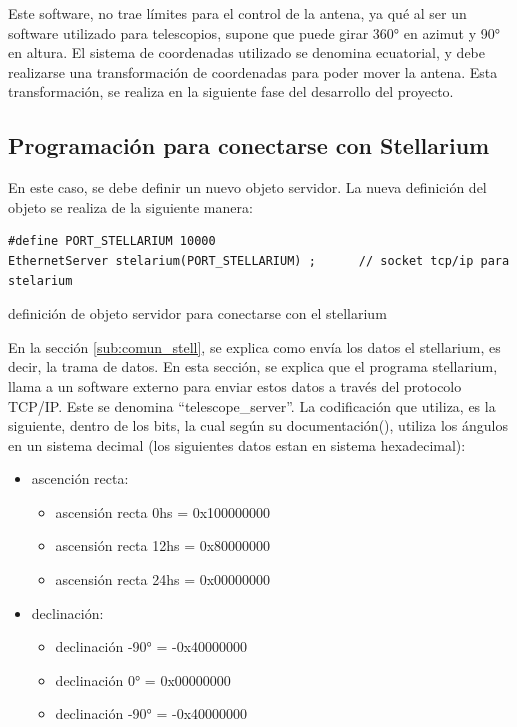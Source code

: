 Este software, no trae límites para el control de la antena, ya qué al ser un software utilizado para telescopios, supone que puede girar 360° en azimut y 90° en altura. El sistema de coordenadas utilizado se denomina ecuatorial, y debe realizarse una transformación de coordenadas para poder mover la antena. Esta transformación, se realiza en la siguiente fase del desarrollo del proyecto. 



\subsection{Programación para conectarse con Stellarium} 

En este caso, se debe definir un nuevo objeto servidor. La nueva definición del objeto se realiza de la siguiente manera: 

\begin{listing}[ht]
	\begin{verbatim}
#define PORT_STELLARIUM 10000
EthernetServer stelarium(PORT_STELLARIUM) ;      // socket tcp/ip para stelarium 
	\end{verbatim}
\caption{definición de objeto servidor para conectarse con el stellarium}
\end{listing}

En la sección \ref{sub:comun_stell}, se explica como envía los datos el stellarium, es decir, la trama de datos. En esta sección, se explica que el programa stellarium, llama a un software externo para enviar estos datos a través del protocolo TCP/IP. Este se denomina ``telescope\_server''. La codificación que utiliza, es la siguiente, dentro de los bits, la cual según su documentación(\cite{telscopeserv}), utiliza los ángulos en un sistema decimal (los siguientes datos estan en sistema hexadecimal): 

\begin{itemize}
	\item ascención recta: 
		\begin{itemize}
		 \item	ascensión recta 0hs  = 0x100000000   		
		 \item	ascensión recta 12hs = 0x80000000 
		 \item	ascensión recta 24hs = 0x00000000
	\end{itemize}
	\item declinación: 
		\begin{itemize}
		  \item	declinación -90° = -0x40000000
		  \item	declinación  0°  =  0x00000000
		  \item	declinación -90° = -0x40000000
		\end{itemize}
\end{itemize}

